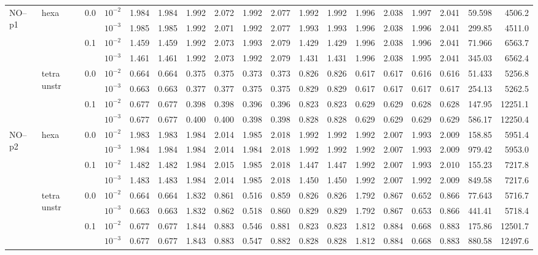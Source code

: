 \begin{longtable}{llclrrrrrrrrrrrrrr}
\multirow{8}{*}{NO--p1} & \multirow{4}{*}{hexa} & \multirow{2}{*}{0.0} & $10^{-2}$ & 1.984 & 1.984 & 1.992 & 2.072 & 1.992 & 2.077 & 1.992 & 1.992 & 1.996 & 2.038 & 1.997 & 2.041 & 59.598 & 4506.2 \\
& & & $10^{-3}$ & 1.985 & 1.985 & 1.992 & 2.071 & 1.992 & 2.077 & 1.993 & 1.993 & 1.996 & 2.038 & 1.996 & 2.041 & 299.85 & 4511.0 \\\cline{3-18}
& & \multirow{2}{*}{0.1} & $10^{-2}$ & 1.459 & 1.459 & 1.992 & 2.073 & 1.993 & 2.079 & 1.429 & 1.429 & 1.996 & 2.038 & 1.996 & 2.041 & 71.966 & 6563.7 \\
& & & $10^{-3}$ & 1.461 & 1.461 & 1.992 & 2.073 & 1.992 & 2.079 & 1.431 & 1.431 & 1.996 & 2.038 & 1.995 & 2.041 & 345.03 & 6562.4 \\\cline{2-18}
& \multirow{4}{*}{tetra unstr} & \multirow{2}{*}{0.0} & $10^{-2}$ & 0.664 & 0.664 & 0.375 & 0.375 & 0.373 & 0.373 & 0.826 & 0.826 & 0.617 & 0.617 & 0.616 & 0.616 & 51.433 & 5256.8 \\
& & & $10^{-3}$ & 0.663 & 0.663 & 0.377 & 0.377 & 0.375 & 0.375 & 0.829 & 0.829 & 0.617 & 0.617 & 0.617 & 0.617 & 254.13 & 5262.5 \\\cline{3-18}
& & \multirow{2}{*}{0.1} & $10^{-2}$ & 0.677 & 0.677 & 0.398 & 0.398 & 0.396 & 0.396 & 0.823 & 0.823 & 0.629 & 0.629 & 0.628 & 0.628 & 147.95 & 12251.1 \\
& & & $10^{-3}$ & 0.677 & 0.677 & 0.400 & 0.400 & 0.398 & 0.398 & 0.828 & 0.828 & 0.629 & 0.629 & 0.629 & 0.629 & 586.17 & 12250.4 \\\hline

\multirow{8}{*}{NO--p2} & \multirow{4}{*}{hexa} & \multirow{2}{*}{0.0} & $10^{-2}$ & 1.983 & 1.983 & 1.984 & 2.014 & 1.985 & 2.018 & 1.992 & 1.992 & 1.992 & 2.007 & 1.993 & 2.009 & 158.85 & 5951.4 \\
& & & $10^{-3}$ & 1.984 & 1.984 & 1.984 & 2.014 & 1.984 & 2.018 & 1.992 & 1.992 & 1.992 & 2.007 & 1.993 & 2.009 & 979.42 & 5953.0 \\\cline{3-18}
& & \multirow{2}{*}{0.1} & $10^{-2}$ & 1.482 & 1.482 & 1.984 & 2.015 & 1.985 & 2.018 & 1.447 & 1.447 & 1.992 & 2.007 & 1.993 & 2.010 & 155.23 & 7217.8 \\
& & & $10^{-3}$ & 1.483 & 1.483 & 1.984 & 2.014 & 1.985 & 2.018 & 1.450 & 1.450 & 1.992 & 2.007 & 1.992 & 2.009 & 849.58 & 7217.6 \\\cline{2-18}
& \multirow{4}{*}{tetra unstr} & \multirow{2}{*}{0.0} & $10^{-2}$ & 0.664 & 0.664 & 1.832 & 0.861 & 0.516 & 0.859 & 0.826 & 0.826 & 1.792 & 0.867 & 0.652 & 0.866 & 77.643 & 5716.7 \\
& & & $10^{-3}$ & 0.663 & 0.663 & 1.832 & 0.862 & 0.518 & 0.860 & 0.829 & 0.829 & 1.792 & 0.867 & 0.653 & 0.866 & 441.41 & 5718.4 \\\cline{3-18}
& & \multirow{2}{*}{0.1} & $10^{-2}$ & 0.677 & 0.677 & 1.844 & 0.883 & 0.546 & 0.881 & 0.823 & 0.823 & 1.812 & 0.884 & 0.668 & 0.883 & 175.86 & 12501.7 \\
& & & $10^{-3}$ & 0.677 & 0.677 & 1.843 & 0.883 & 0.547 & 0.882 & 0.828 & 0.828 & 1.812 & 0.884 & 0.668 & 0.883 & 880.58 & 12497.6 \\\hline


\end{longtable}
